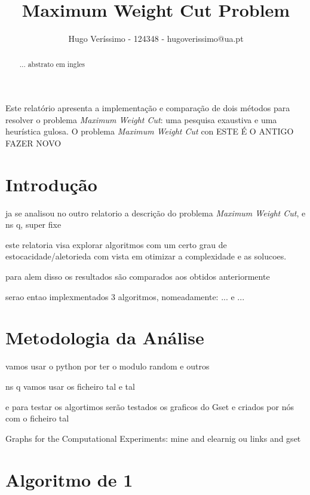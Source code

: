 \documentclass[mirror, portugues]{revdetua}
\begin{document}

\title{Maximum Weight Cut Problem}
\author{Hugo Veríssimo - 124348 - hugoverissimo@ua.pt}
\maketitle

\begin{abstract}
... abstrato em ingles
\end{abstract}

\begin{resumo}
Este relatório apresenta a implementação e comparação de dois métodos para resolver o problema \textit{Maximum Weight Cut}: uma pesquisa exaustiva e uma heurística gulosa. O problema \textit{Maximum Weight Cut} con ESTE É O ANTIGO FAZER NOVO
\end{resumo}

\section{Introdução}

ja se analisou no outro relatorio a descrição do problema \textit{Maximum Weight Cut}, e ns q, super fixe

este relatoria visa explorar algoritmos com um certo grau de estocacidade/aletorieda com vista em otimizar a complexidade e as solucoes.

para alem disso os resultados são comparados aos obtidos anteriormente

serao entao implexmentados 3 algoritmos, nomeadamente: ... e ...

\section{Metodologia da Análise}

vamos usar o python por ter o modulo random e outros

ns q vamos usar os ficheiro tal e tal 

e para testar os algortimos serão testados os graficos do Gset e criados por nós com o ficheiro tal

Graphs for the Computational Experiments: mine and elearnig ou links and gset

\section{Algoritmo de 1}
\end{document}
